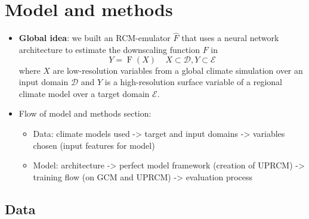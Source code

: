 \documentclass[a4paper,11pt,oneside]{report}
\begin{document}
\chapter{Model and methods}



\begin{itemize}
\item \textbf{Global idea}: we built an RCM-emulator $\hat{F}$ that uses a neural network architecture to estimate the downscaling function $F$ in 
\begin{equation}\label{eq:emulator-equation}
    Y = \operatorname{F}(X) \;\;\;\; X\subset\mathcal{D}, Y\subset\mathcal{E}
    \end{equation}
where $X$ are low-resolution variables from a global climate simulation over an input domain $\mathcal{D}$ and $Y$ is a high-resolution surface variable of a regional climate model over a target domain $\mathcal{E}$. 
\item Flow of model and methods section: 
\begin{itemize}
    \item Data: climate models used -> target and input domains -> variables chosen (input features for model)
    \item Model: architecture -> perfect model framework (creation of UPRCM) -> training flow (on GCM and UPRCM) -> evaluation process
\end{itemize}
\end{itemize}

\section{Data}\label{sec:data}
\end{document}

